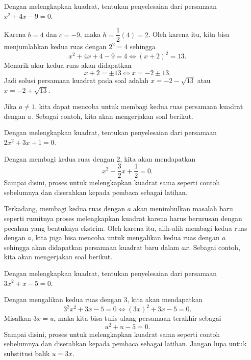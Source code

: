 		\begin{contoh}
			Dengan melengkapkan kuadrat, tentukan penyelesaian dari persamaan $ x^{2} + 4x - 9 = 0 $.
		\end{contoh}
		\begin{jawab}
			Karena $ b = 4 $ dan $ c = -9 $, maka $ h = \dfrac{1}{2}\left(4\right) = 2 $. Oleh karena itu, kita bisa menjumlahkan kedua ruas dengan $ 2^{2} = 4 $ sehingga
			\[ x^{2} + 4x + 4 - 9 = 4 \iff \left(x + 2\right)^{2} = 13. \]
			Menarik akar kedua ruas akan didapatkan
			\[ x + 2 = \pm 13 \iff x = -2 \pm 13. \]
			Jadi solusi persamaan kuadrat pada soal adalah $ x = -2 - \sqrt{13} $ atau $ x = -2 + \sqrt{13} $.
		\end{jawab}
		
		\par Jika $ a \ne 1 $, kita dapat mencoba untuk membagi kedua ruas persamaan kuadrat dengan $ a $. Sebagai contoh, kita akan mengerjakan soal berikut.
		
		\begin{contoh}
			Dengan melengkapkan kuadrat, tentukan penyelesaian dari persamaan $ 2x^{2} + 3x + 1 = 0 $.
		\end{contoh}
		\begin{jawab}
			Dengan membagi kedua ruas dengan 2, kita akan mendapatkan
			\[ x^{2} + \frac{3}{2}x + \frac{1}{2} = 0. \]
			Sampai disini, proses untuk melengkapkan kuadrat sama seperti contoh sebelumnya dan diserahkan kepada pembaca sebagai latihan.
		\end{jawab}
		
		\par Terkadang, membagi kedua ruas dengan $ a $ akan menimbulkan masalah baru seperti rumitnya proses melengkapkan kuadrat karena harus berurusan dengan pecahan yang bentuknya ekstrim. Oleh karena itu, alih-alih membagi kedua ruas dengan $ a $, kita juga bisa mencoba untuk mengalikan kedua ruas dengan $ a $ sehingga akan didapatkan persamaan kuadrat baru dalam $ ax $. Sebagai contoh, kita akan mengerjakan soal berikut.
		
		\begin{contoh}
			Dengan melengkapkan kuadrat, tentukan penyelesaian dari persamaan $ 3x^{2} + x - 5 = 0 $.
		\end{contoh}
		\begin{jawab}
			Dengan mengalikan kedua ruas dengan 3, kita akan mendapatkan
			\[ 3^{2}x^{2} + 3x - 5 = 0 \iff \left(3x\right)^{2} + 3x - 5 = 0. \]
			Misalkan $ 3x = u $, maka kita bisa tulis ulang persamaan terakhir sebagai
			\[ u^{2} + u - 5 = 0. \]
			Sampai disini, proses untuk melengkapkan kuadrat sama seperti contoh sebelumnya dan diserahkan kepada pembaca sebagai latihan. Jangan lupa untuk substitusi balik $ u = 3x $.
		\end{jawab}
	
